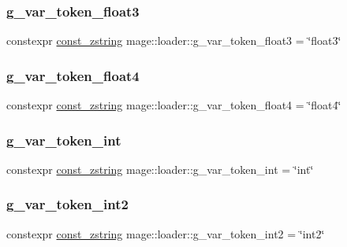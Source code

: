\subsubsection{\texorpdfstring{g\+\_\+var\+\_\+token\+\_\+float3}{g\_var\_token\_float3}}
{\footnotesize\ttfamily constexpr \mbox{\hyperlink{namespacemage_abfd9206dc607ceb5d13ec68bf075a5c0}{const\+\_\+zstring}} mage\+::loader\+::g\+\_\+var\+\_\+token\+\_\+float3 = \char`\"{}float3\char`\"{}}

\mbox{\label{namespacemage_1_1loader_a090338735c82aa00b47b04740d53bdcd}} 
\subsubsection{\texorpdfstring{g\+\_\+var\+\_\+token\+\_\+float4}{g\_var\_token\_float4}}
{\footnotesize\ttfamily constexpr \mbox{\hyperlink{namespacemage_abfd9206dc607ceb5d13ec68bf075a5c0}{const\+\_\+zstring}} mage\+::loader\+::g\+\_\+var\+\_\+token\+\_\+float4 = \char`\"{}float4\char`\"{}}

\mbox{\label{namespacemage_1_1loader_aa147b458d6b9bbe4b481df6468027055}} 
\subsubsection{\texorpdfstring{g\+\_\+var\+\_\+token\+\_\+int}{g\_var\_token\_int}}
{\footnotesize\ttfamily constexpr \mbox{\hyperlink{namespacemage_abfd9206dc607ceb5d13ec68bf075a5c0}{const\+\_\+zstring}} mage\+::loader\+::g\+\_\+var\+\_\+token\+\_\+int = \char`\"{}int\char`\"{}}

\mbox{\label{namespacemage_1_1loader_a56b5eb839752f752fe25139e893d02d5}} 
\subsubsection{\texorpdfstring{g\+\_\+var\+\_\+token\+\_\+int2}{g\_var\_token\_int2}}
{\footnotesize\ttfamily constexpr \mbox{\hyperlink{namespacemage_abfd9206dc607ceb5d13ec68bf075a5c0}{const\+\_\+zstring}} mage\+::loader\+::g\+\_\+var\+\_\+token\+\_\+int2 = \char`\"{}int2\char`\"{}}

